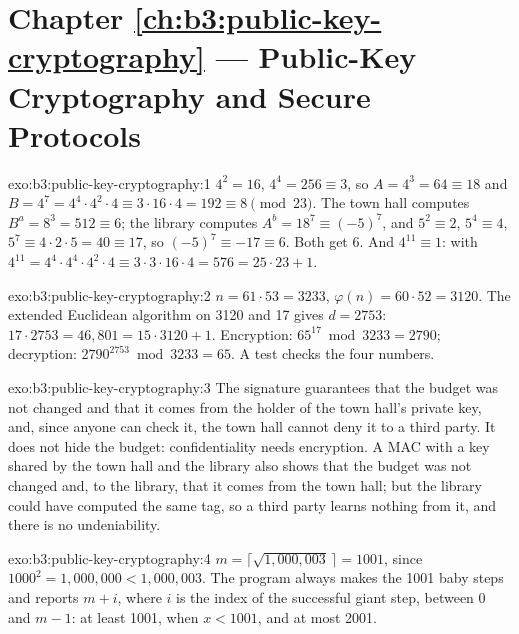 \section*{Chapter \ref{ch:b3:public-key-cryptography} --- Public-Key Cryptography and Secure Protocols}

\begin{solution}{exo:b3:public-key-cryptography:1}
$4^2 = 16$, $4^4 = 256 \equiv 3$, so $A = 4^3 = 64 \equiv 18$ and $B = 4^7 = 4^4 \cdot 4^2 \cdot 4 \equiv 3 \cdot 16 \cdot 4 = 192 \equiv 8 \pmod{23}$. The town hall computes $B^a = 8^3 = 512 \equiv 6$; the library computes $A^b = 18^7 \equiv (-5)^7$, and $5^2 \equiv 2$, $5^4 \equiv 4$, $5^7 \equiv 4 \cdot 2 \cdot 5 = 40 \equiv 17$, so $(-5)^7 \equiv -17 \equiv 6$. Both get 6. And $4^{11} \equiv 1$: with $4^{11} = 4^4 \cdot 4^4 \cdot 4^2 \cdot 4 \equiv 3 \cdot 3 \cdot 16 \cdot 4 = 576 = 25 \cdot 23 + 1$.
\end{solution}

\begin{solution}{exo:b3:public-key-cryptography:2}
$n = 61 \cdot 53 = 3233$, $\varphi(n) = 60 \cdot 52 = 3120$. The extended Euclidean algorithm on 3120 and 17 gives $d = 2753$: $17 \cdot 2753 = 46{,}801 = 15 \cdot 3120 + 1$. Encryption: $65^{17} \bmod 3233 = 2790$; decryption: $2790^{2753} \bmod 3233 = 65$. A test checks the four numbers.
\end{solution}

\begin{solution}{exo:b3:public-key-cryptography:3}
The signature guarantees that the budget was not changed and that it comes from the holder of the town hall's private key, and, since anyone can check it, the town hall cannot deny it to a third party. It does not hide the budget: confidentiality needs encryption. A MAC with a key shared by the town hall and the library also shows that the budget was not changed and, to the library, that it comes from the town hall; but the library could have computed the same tag, so a third party learns nothing from it, and there is no undeniability.
\end{solution}

\begin{solution}{exo:b3:public-key-cryptography:4}
$m = \lceil \sqrt{1{,}000{,}003}\, \rceil = 1001$, since $1000^2 = 1{,}000{,}000 < 1{,}000{,}003$. The program always makes the 1001 baby steps and reports $m + i$, where $i$ is the index of the successful giant step, between 0 and $m - 1$: at least 1001, when $x < 1001$, and at most 2001.
\end{solution}

